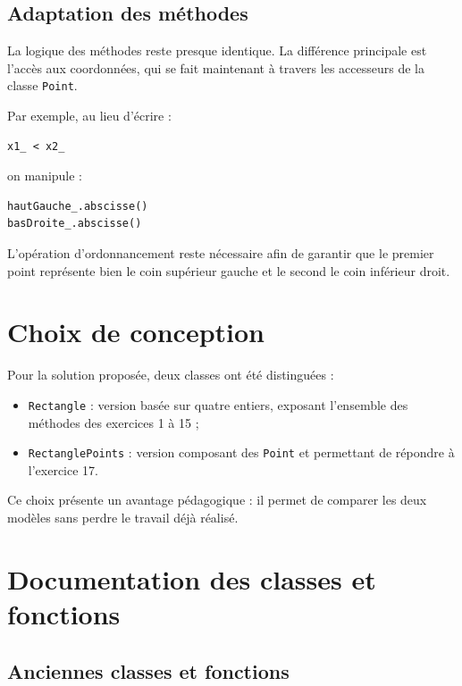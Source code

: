 \documentclass[12pt,a4paper]{article}
\begin{document}
\subsection{Adaptation des m\'ethodes}
La logique des m\'ethodes reste presque identique. La diff\'erence principale est l'acc\`es aux coordonn\'ees, qui se fait maintenant \`a travers les accesseurs de la classe \texttt{Point}.

Par exemple, au lieu d'\'ecrire :
\begin{lstlisting}[style=cppstyle]
x1_ < x2_
\end{lstlisting}

on manipule :
\begin{lstlisting}[style=cppstyle]
hautGauche_.abscisse()
basDroite_.abscisse()
\end{lstlisting}

L'op\'eration d'ordonnancement reste n\'ecessaire afin de garantir que le premier point repr\'esente bien le coin sup\'erieur gauche et le second le coin inf\'erieur droit.

\section{Choix de conception}
Pour la solution propos\'ee, deux classes ont \'et\'e distingu\'ees :
\begin{itemize}[leftmargin=*]
    \item \texttt{Rectangle} : version bas\'ee sur quatre entiers, exposant l'ensemble des m\'ethodes des exercices 1 \`a 15 ;
    \item \texttt{RectanglePoints} : version composant des \texttt{Point} et permettant de r\'epondre \`a l'exercice 17.
\end{itemize}

Ce choix pr\'esente un avantage p\'edagogique : il permet de comparer les deux mod\`eles sans perdre le travail d\'ej\`a r\'ealis\'e.

\section{Documentation des classes et fonctions}
\subsection{Anciennes classes et fonctions}
\end{document}
